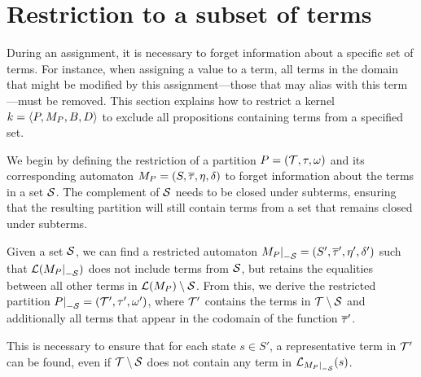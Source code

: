 \section{Restriction to a subset of terms}


During an assignment, it is necessary to forget information about a specific set of terms.
For instance, when assigning a value to a term, all terms in the domain that might be modified by this assignment---those that may alias with this term---must be removed.
This section explains how to restrict a kernel $k = \langle P, M_P, B, D\rangle$
to exclude all propositions containing terms from a specified set.

We begin by defining the restriction of a partition $P = (\mathcal{T}, \tau, \omega)$ and its corresponding automaton $M_P = (S, \overline{\tau}, \eta, \delta)$ to forget information about the terms in a set $\mathcal{S}$.
The complement of $\mathcal{S}$ needs to be closed under subterms, ensuring that the
resulting partition will still contain terms from a set that remains closed under subterms.

Given a set $\mathcal{S}$, we can find a restricted
automaton $\restr{M_P}{-\Set} = (S', \otau', \eta', \delta')$ such that $\L(\restr{M_P}{-\Set})$ does not include terms from
$\mathcal{S}$, but retains the equalities between all other terms in $\mathcal{L}(M_P) \setminus \mathcal{S}$.
From this, we derive the restricted partition $\restr{P}{-\Set} = (\T', \tau', \omega')$, where $\mathcal{T}'$ contains
the terms in $\mathcal{T} \setminus \mathcal{S}$ and additionally all terms that appear in the codomain of the function $\overline{\tau}'$.

This is necessary to ensure that for each state $s \in S'$, a representative term in $\mathcal{T}'$ can be found,
even if $\mathcal{T} \setminus \mathcal{S}$ does not contain any term in $\L_{\restr{M_P}{-\Set}}(s)$.

